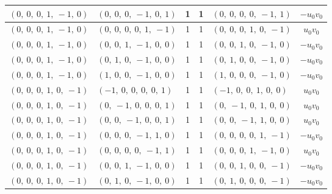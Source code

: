 \documentclass[11pt]{article}
\theoremstyle{definition}
\begin{document}
\begin{longtable}{|l|l|c|c|l|c|}
    \hline
    $\left( 0, \  0, \  0, \  1, \  -1, \  0\right)$ & $\left( 0, \  0, \  0, \  -1, \  0, \  1\right)$ & 1 & 1 & $\left( 0, \  0, \  0, \  0, \  -1, \  1\right)$ & $- u_{0} v_{0}$ \\
    \hline
    $\left( 0, \  0, \  0, \  1, \  -1, \  0\right)$ & $\left( 0, \  0, \  0, \  0, \  1, \  -1\right)$ & 1 & 1 & $\left( 0, \  0, \  0, \  1, \  0, \  -1\right)$ & $u_{0} v_{0}$ \\
    \hline
    $\left( 0, \  0, \  0, \  1, \  -1, \  0\right)$ & $\left( 0, \  0, \  1, \  -1, \  0, \  0\right)$ & 1 & 1 & $\left( 0, \  0, \  1, \  0, \  -1, \  0\right)$ & $- u_{0} v_{0}$ \\
    \hline
    $\left( 0, \  0, \  0, \  1, \  -1, \  0\right)$ & $\left( 0, \  1, \  0, \  -1, \  0, \  0\right)$ & 1 & 1 & $\left( 0, \  1, \  0, \  0, \  -1, \  0\right)$ & $- u_{0} v_{0}$ \\
    \hline
    $\left( 0, \  0, \  0, \  1, \  -1, \  0\right)$ & $\left( 1, \  0, \  0, \  -1, \  0, \  0\right)$ & 1 & 1 & $\left( 1, \  0, \  0, \  0, \  -1, \  0\right)$ & $- u_{0} v_{0}$ \\
    \hline
    $\left( 0, \  0, \  0, \  1, \  0, \  -1\right)$ & $\left( -1, \  0, \  0, \  0, \  0, \  1\right)$ & 1 & 1 & $\left( -1, \  0, \  0, \  1, \  0, \  0\right)$ & $u_{0} v_{0}$ \\
    \hline
    $\left( 0, \  0, \  0, \  1, \  0, \  -1\right)$ & $\left( 0, \  -1, \  0, \  0, \  0, \  1\right)$ & 1 & 1 & $\left( 0, \  -1, \  0, \  1, \  0, \  0\right)$ & $u_{0} v_{0}$ \\
    \hline
    $\left( 0, \  0, \  0, \  1, \  0, \  -1\right)$ & $\left( 0, \  0, \  -1, \  0, \  0, \  1\right)$ & 1 & 1 & $\left( 0, \  0, \  -1, \  1, \  0, \  0\right)$ & $u_{0} v_{0}$ \\
    \hline
    $\left( 0, \  0, \  0, \  1, \  0, \  -1\right)$ & $\left( 0, \  0, \  0, \  -1, \  1, \  0\right)$ & 1 & 1 & $\left( 0, \  0, \  0, \  0, \  1, \  -1\right)$ & $- u_{0} v_{0}$ \\
    \hline
    $\left( 0, \  0, \  0, \  1, \  0, \  -1\right)$ & $\left( 0, \  0, \  0, \  0, \  -1, \  1\right)$ & 1 & 1 & $\left( 0, \  0, \  0, \  1, \  -1, \  0\right)$ & $u_{0} v_{0}$ \\
    \hline
    $\left( 0, \  0, \  0, \  1, \  0, \  -1\right)$ & $\left( 0, \  0, \  1, \  -1, \  0, \  0\right)$ & 1 & 1 & $\left( 0, \  0, \  1, \  0, \  0, \  -1\right)$ & $- u_{0} v_{0}$ \\
    \hline
    $\left( 0, \  0, \  0, \  1, \  0, \  -1\right)$ & $\left( 0, \  1, \  0, \  -1, \  0, \  0\right)$ & 1 & 1 & $\left( 0, \  1, \  0, \  0, \  0, \  -1\right)$ & $- u_{0} v_{0}$ \\

\end{longtable}
\end{document}
